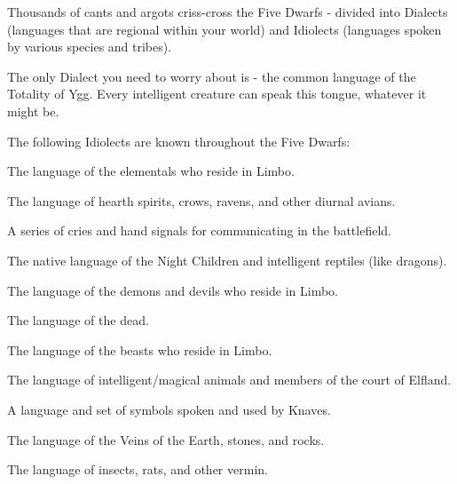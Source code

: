 
Thousands of cants and argots criss-cross the Five Dwarfs - divided into Dialects (languages that are regional within your world) and Idiolects (languages spoken by various species and tribes).

The only Dialect you need to worry about is  - the common language of the Totality of Ygg.  Every intelligent creature can speak this tongue, whatever it might be. 

The following Idiolects are known throughout the Five Dwarfs:


The language of the elementals who reside in Limbo.


The language of hearth spirits, crows, ravens, and other diurnal avians.


A series of cries and hand signals for communicating in the battlefield.


The native language of the Night Children and intelligent reptiles (like dragons).


The language of the demons and devils who reside in Limbo.

\cbreak


The language of the dead.


The language of the beasts who reside in Limbo.



The language of intelligent/magical animals and members of the court of Elfland.


A language and set of symbols spoken and used by Knaves.


The language of the Veins of the Earth, stones, and rocks.


The language of insects, rats, and other vermin.
